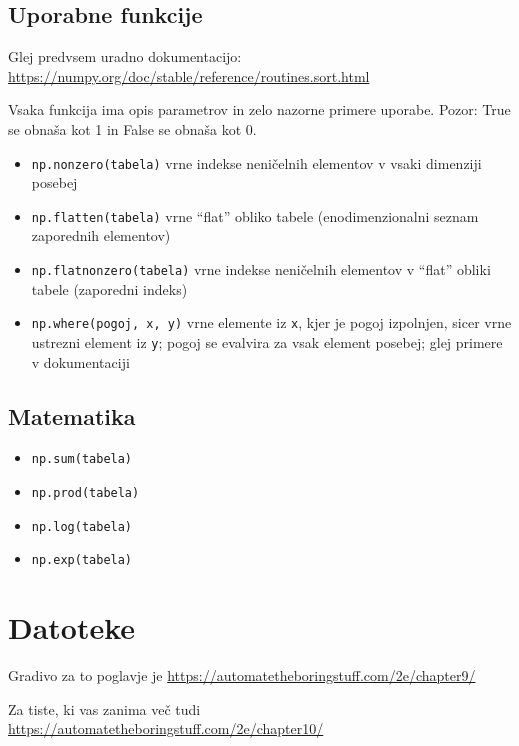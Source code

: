 \documentclass[
]{book}
\providecommand{\tightlist}{%
  \setlength{\itemsep}{0pt}\setlength{\parskip}{0pt}}
\begin{document}
\hypertarget{uporabne-funkcije}{%
\section{Uporabne funkcije}\label{uporabne-funkcije}}

Glej predvsem uradno dokumentacijo: \url{https://numpy.org/doc/stable/reference/routines.sort.html}

Vsaka funkcija ima opis parametrov in zelo nazorne primere uporabe.
Pozor: True se obnaša kot 1 in False se obnaša kot 0.

\begin{itemize}
\tightlist
\item
  \texttt{np.nonzero(tabela)} vrne indekse neničelnih elementov v vsaki dimenziji posebej
\item
  \texttt{np.flatten(tabela)} vrne ``flat'' obliko tabele (enodimenzionalni seznam zaporednih elementov)
\item
  \texttt{np.flatnonzero(tabela)} vrne indekse neničelnih elementov v ``flat'' obliki tabele (zaporedni indeks)
\item
  \texttt{np.where(pogoj,\ x,\ y)} vrne elemente iz \texttt{x}, kjer je pogoj izpolnjen, sicer vrne ustrezni element iz \texttt{y}; pogoj se evalvira za vsak element posebej; glej primere v dokumentaciji
\end{itemize}

\hypertarget{matematika}{%
\section{Matematika}\label{matematika}}

\begin{itemize}
\tightlist
\item
  \texttt{np.sum(tabela)}
\item
  \texttt{np.prod(tabela)}
\item
  \texttt{np.log(tabela)}
\item
  \texttt{np.exp(tabela)}
\end{itemize}

\hypertarget{datoteke}{%
\chapter{Datoteke}\label{datoteke}}

Gradivo za to poglavje je \url{https://automatetheboringstuff.com/2e/chapter9/}

Za tiste, ki vas zanima več tudi \url{https://automatetheboringstuff.com/2e/chapter10/}
\end{document}
